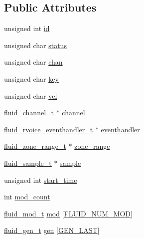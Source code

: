 \subsection*{Public Attributes}
\begin{DoxyCompactItemize}
\item 
unsigned int \hyperlink{struct__fluid__voice__t_a01c265f3befd19df72c3a7ca6ef62917}{id}
\item 
unsigned char \hyperlink{struct__fluid__voice__t_ab34890439d84bf004364d122c197aeb8}{status}
\item 
unsigned char \hyperlink{struct__fluid__voice__t_a45aaf19cb332606662824896f7060001}{chan}
\item 
unsigned char \hyperlink{struct__fluid__voice__t_aaef662aed8ce7de0932ddb70d481d622}{key}
\item 
unsigned char \hyperlink{struct__fluid__voice__t_a2aedf5707c2e3332ddf61875991c2ff2}{vel}
\item 
\hyperlink{fluidsynth__priv_8h_a9e766203efa8135ece6f462e9caa1b12}{fluid\+\_\+channel\+\_\+t} $\ast$ \hyperlink{struct__fluid__voice__t_a977320cbe5f3774c839e12def55a2fd1}{channel}
\item 
\hyperlink{fluidsynth__priv_8h_aa59fe8f0195e9f5099f538d38b126e2a}{fluid\+\_\+rvoice\+\_\+eventhandler\+\_\+t} $\ast$ \hyperlink{struct__fluid__voice__t_a6f53bff277d799770e0f820255e14c0e}{eventhandler}
\item 
\hyperlink{fluidsynth__priv_8h_ac8502f0049ba8c20821b136e611462da}{fluid\+\_\+zone\+\_\+range\+\_\+t} $\ast$ \hyperlink{struct__fluid__voice__t_ae59705ecac10249158cd39128cd7783d}{zone\+\_\+range}
\item 
\hyperlink{types_8h_abf9174d452679ca1a4ee7d693fb773cf}{fluid\+\_\+sample\+\_\+t} $\ast$ \hyperlink{struct__fluid__voice__t_a0d1a19093f9272029f8d12058b73015e}{sample}
\item 
unsigned int \hyperlink{struct__fluid__voice__t_a34ed7fac9f4afac5e45b2e17439880cb}{start\+\_\+time}
\item 
int \hyperlink{struct__fluid__voice__t_a2803ecd3cd10950e77bb64179fa73a44}{mod\+\_\+count}
\item 
\hyperlink{types_8h_a6c727efab500d6c0c350d4292e9aa5ef}{fluid\+\_\+mod\+\_\+t} \hyperlink{struct__fluid__voice__t_a552c78de071a27c5648387afe3e26b3a}{mod} \mbox{[}\hyperlink{fluidsynth__priv_8h_a36d07f04a69f257b9a696b7a955b66c7}{F\+L\+U\+I\+D\+\_\+\+N\+U\+M\+\_\+\+M\+OD}\mbox{]}
\item 
\hyperlink{fluid__gen_8h_a018737d76d5ad530b622bd27b70701b0}{fluid\+\_\+gen\+\_\+t} \hyperlink{struct__fluid__voice__t_ac9d1802d04aaa7e83006128ac17b2a20}{gen} \mbox{[}\hyperlink{gen_8h_ad17a24ae3b25f3b8cc5762f818eef9b4a9c372c341b7b1a718f0016f40c615cf3}{G\+E\+N\+\_\+\+L\+A\+ST}\mbox{]}

\end{DoxyCompactItemize}
